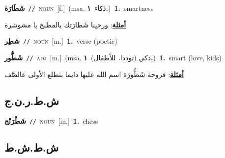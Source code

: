 \documentclass[10pt,a4paper,twoside]{article} %
\begin{document}
\begin{multicols}{2}
{\setlength\topsep{0pt}\textbf{\foreignlanguage{arabic}{شَطَارَة}}\ {\color{gray}\texttt{//}\color{black}}\ \textsc{noun}\ [f.]\ \color{gray}(msa. \foreignlanguage{arabic}{ذكاء}~\foreignlanguage{arabic}{\textbf{١.}})\color{black}\ \textbf{1.}~smartness\  \begin{flushright}\color{gray}\foreignlanguage{arabic}{\textbf{\underline{\foreignlanguage{arabic}{أمثلة}}}: ورجينا شَطارَتك بالمطبخ يا مشوشرة}\end{flushright}\color{black}} \vspace{2mm}

{\setlength\topsep{0pt}\textbf{\foreignlanguage{arabic}{شَطِر}}\ {\color{gray}\texttt{//}\color{black}}\ \textsc{noun}\ [m.]\ \textbf{1.}~verse (poetic)\ } \vspace{2mm}

{\setlength\topsep{0pt}\textbf{\foreignlanguage{arabic}{شَطُّور}}\ {\color{gray}\texttt{//}\color{black}}\ \textsc{adj}\ [m.]\ \color{gray}(msa. \foreignlanguage{arabic}{ذكي (توددا، للأطفال)}~\foreignlanguage{arabic}{\textbf{١.}})\color{black}\ \textbf{1.}~smart (love, kids)\  \begin{flushright}\color{gray}\foreignlanguage{arabic}{\textbf{\underline{\foreignlanguage{arabic}{أمثلة}}}: فروحة شَطُّورَة اسم الله عليها دايما بتطلع الأولى عالصَّف}\end{flushright}\color{black}} \vspace{2mm}

\vspace{-3mm}
\subsection*{\color{blue}\foreignlanguage{arabic}{ش.ط.ر.ن.ج}\color{blue}{ (ntws)}} 

{\setlength\topsep{0pt}\textbf{\foreignlanguage{arabic}{شَطْرَنْج}}\ {\color{gray}\texttt{//}\color{black}}\ \textsc{noun}\ [m.]\ \textbf{1.}~chess\ } \vspace{2mm}

\vspace{-3mm}
\subsection*{\color{blue}\foreignlanguage{arabic}{ش.ط.ش.ط}\color{blue}{}} 


\end{multicols}
\end{document}
